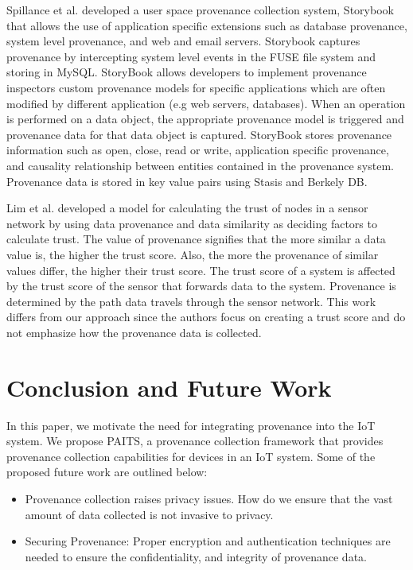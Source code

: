 \documentclass[conference]{IEEEtran}
\begin{document}
\par Spillance et al. \cite{story} developed a user space provenance collection system, Storybook that allows the use of application specific extensions such as database provenance, system level provenance, and web and email servers. Storybook captures provenance by intercepting system level events in the FUSE file system and storing in MySQL. StoryBook allows developers to implement provenance inspectors custom provenance models for specific applications which are often modified by different application (e.g web servers, databases). When an operation is performed on a data object, the appropriate provenance model is triggered and provenance data for that data object is captured. StoryBook stores provenance information such as open, close, read or write, application specific provenance, and causality relationship between entities contained in the provenance system. Provenance data is stored in key value pairs using Stasis and Berkely DB. 



\par Lim et al. \cite{lim} developed a
model for calculating the trust of nodes in a sensor network by using data
provenance and data similarity as deciding factors to calculate trust. The value of
provenance signifies that the more similar a data value is, the higher the trust score.
Also, the more the provenance of similar values differ, the higher their trust score. The trust score of a system is affected by the trust score of the sensor that forwards data to the system. Provenance is determined by the path data travels through the sensor network. This work differs from our approach since the authors focus on creating a trust score and do not emphasize
how the provenance data is collected. 

\section{Conclusion and Future Work}
In this paper, we motivate the need for integrating provenance into the IoT system. 
We propose PAITS, a provenance collection framework that provides provenance collection capabilities for devices in an IoT system. Some of the proposed future work are outlined below:
\begin{itemize}

\item Provenance collection raises privacy issues. How do we ensure that the vast amount of data collected is not invasive to privacy.

\item Securing Provenance: Proper encryption and authentication techniques \cite{Hasan:2009:CFP:1525908.1525909} are needed to ensure the confidentiality, and integrity of provenance data.

\end{itemize}
\end{document}

